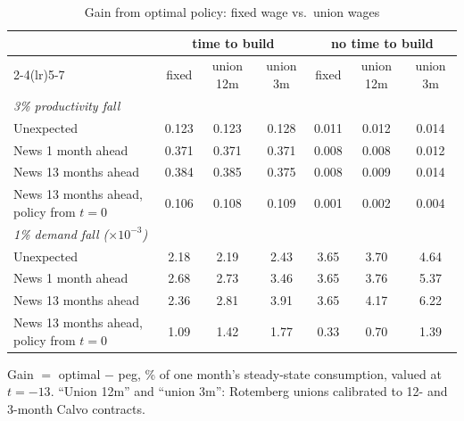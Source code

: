 \documentclass[11pt]{article}
\begin{document}
\begin{table}[h]
  \centering
  \caption{Gain from optimal policy: fixed wage vs.\ union wages}\label{tab:gains}
  \small\setlength{\tabcolsep}{4.5pt}
  \begin{tabular}{lcccccc}
    \toprule
    & \multicolumn{3}{c}{time to build} & \multicolumn{3}{c}{no time to build} \\
    \cmidrule(lr){2-4}\cmidrule(lr){5-7}
    & fixed & union 12m & union 3m & fixed & union 12m & union 3m \\
    \midrule
    \multicolumn{7}{l}{\emph{3\% productivity fall}}\\
    Unexpected & 0.123 & 0.123 & 0.128 & 0.011 & 0.012 & 0.014 \\
    News 1 month ahead & 0.371 & 0.371 & 0.371 & 0.008 & 0.008 & 0.012 \\
    News 13 months ahead & 0.384 & 0.385 & 0.375 & 0.008 & 0.009 & 0.014 \\
    News 13 months ahead, policy from $t=0$ & 0.106 & 0.108 & 0.109 & 0.001 & 0.002 & 0.004 \\
    \midrule
    \multicolumn{7}{l}{\emph{1\% demand fall ($\times10^{-3}$)}}\\
    Unexpected & 2.18 & 2.19 & 2.43 & 3.65 & 3.70 & 4.64 \\
    News 1 month ahead & 2.68 & 2.73 & 3.46 & 3.65 & 3.76 & 5.37 \\
    News 13 months ahead & 2.36 & 2.81 & 3.91 & 3.65 & 4.17 & 6.22 \\
    News 13 months ahead, policy from $t=0$ & 1.09 & 1.42 & 1.77 & 0.33 & 0.70 & 1.39 \\
    \bottomrule
  \end{tabular}

  \medskip
  \parbox{0.95\textwidth}{\footnotesize Gain $=$ optimal $-$ peg, \% of one month's steady-state
  consumption, valued at $t=-13$. ``Union 12m'' and ``union 3m'': Rotemberg unions calibrated to 12- and
  3-month Calvo contracts.}
\end{table}
\end{document}
